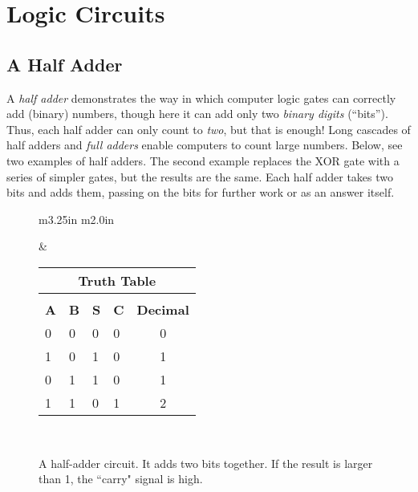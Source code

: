\section{Logic Circuits}

\subsection*{A Half Adder}

A \emph{half adder} demonstrates the way in which computer logic gates can correctly add (binary) numbers, though here it can add only two \emph{binary digits} (``bits''). Thus, each half adder can only count to \emph{two}, but that is enough!  Long cascades of half adders and \emph{full adders} enable computers to count large numbers. Below, see two examples of half adders. The second example replaces the XOR gate with a series of simpler gates, but the results are the same. Each half adder takes two bits and adds them, passing on the bits for further work or as an answer itself.

\bigskip

\begin{figure}[h!]
\begin{center}
\begin{tabular}{m{3.25in} m{2.0in}}



&

\begin{tabular}{ll | ll | c}
\multicolumn{5}{c}{\textbf{Truth Table}}\\
\hline\\[\negsep]
\textbf{A} & \textbf{B} & \textbf{S} & \textbf{C} & \textbf{Decimal}\\
\hline
0 & 0 & 0 & 0 & 0 \\
1 & 0 & 1  & 0 & 1 \\
0 & 1 & 1  & 0 & 1 \\
1 & 1 & 0  & 1 & 2 \\
\hline
\end{tabular}

\\

\end{tabular}

\caption{A half-adder circuit. It adds two bits together. If the result is larger than 1, the ``carry" signal is high.}
\end{center}
\end{figure}


